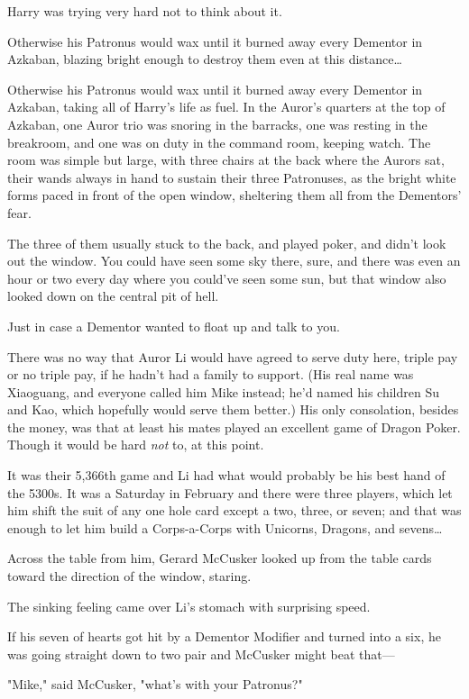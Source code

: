 Harry was trying very hard not to think about it.

Otherwise his Patronus would wax until it burned away every Dementor in
Azkaban, blazing bright enough to destroy them even at this distance…

Otherwise his Patronus would wax until it burned away every Dementor in
Azkaban, taking all of Harry's life as fuel.
\later
In the Auror's quarters at the top of Azkaban, one Auror trio was snoring in
the barracks, one was resting in the breakroom, and one
was on duty in the command room, keeping watch. The room was
simple but large, with three chairs at the back where the Aurors sat, their wands
always in hand to sustain their three Patronuses, as the bright white forms
paced in front of the open window, sheltering them all from the Dementors' fear.

The three of them usually stuck to the back, and played poker, and didn't look
out the window. You could have seen some sky there, sure, and there was even an
hour or two every day where you could've seen some sun, but that window also
looked down on the central pit of hell.

Just in case a Dementor wanted to float up and talk to you.

There was no way that Auror Li would have agreed to serve duty here, triple pay
or no triple pay, if he hadn't had a family to support. (His real name was
Xiaoguang, and everyone called him Mike instead; he'd named his children Su and
Kao, which hopefully would serve them better.) His only consolation, besides
the money, was that at least his mates played an excellent game of Dragon
Poker. Though it would be hard \emph{not} to, at this point.

It was their 5,366th game and Li had what would probably be his best hand of
the 5300s. It was a Saturday in February and there were three players, which
let him shift the suit of any one hole card except a two, three, or seven; and
that was enough to let him build a Corps-a-Corps with Unicorns, Dragons, and
sevens…

Across the table from him, Gerard McCusker looked up from the table cards
toward the direction of the window, staring.

The sinking feeling came over Li's stomach with surprising speed.

If his seven of hearts got hit by a Dementor Modifier and turned into a six, he
was going straight down to two pair and McCusker might beat that---

"Mike," said McCusker, "what's with your Patronus?"

